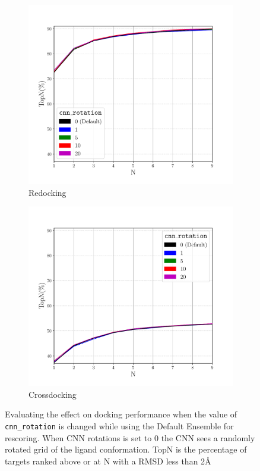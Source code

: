 \documentclass[journal=jcisd8,manuscript=article]{achemso}
\begin{document}
\begin{figure}    
        \begin{subfigure}[b]{0.48\textwidth}    
		\centering
		\includegraphics[width=\textwidth]{figures/redocking/sweep_cnnrot_line.pdf}
		\caption{Redocking}
		\label{fig:CNNRotRedock}
        \end{subfigure}    
        \begin{subfigure}[b]{0.48\textwidth}    
		\centering
		\includegraphics[width=\textwidth]{figures/crossdocking/sweep_cnnrot_line.pdf}
		\caption{Crossdocking}
		\label{fig:CNNRotCrossdock}
        \end{subfigure}    
	\caption{Evaluating the effect on docking performance when the value of \texttt{cnn\_rotation} is changed while using the Default Ensemble for rescoring. When CNN rotations is set to 0 the CNN sees a randomly rotated grid of the ligand conformation. TopN is the percentage of targets ranked above or at N with a RMSD less than 2{\AA}}
	\label{fig:CNNRot}
\end{figure}
\end{document}
